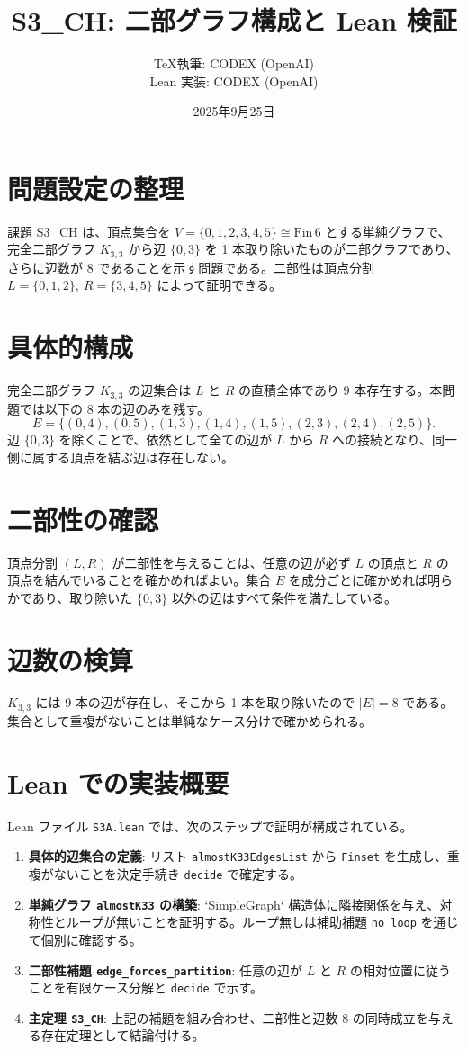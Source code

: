 \documentclass[luatex]{ltjsarticle}
\title{S3\_CH: 二部グラフ構成と Lean 検証}
\author{TeX執筆: CODEX (OpenAI) \\ Lean 実装: CODEX (OpenAI)}
\date{2025年9月25日}
\begin{document}
\maketitle

\section{問題設定の整理}
課題 S3\_CH は、頂点集合を \(V = \{0,1,2,3,4,5\} \cong \mathrm{Fin}\,6\) とする単純グラフで、完全二部グラフ \(K_{3,3}\) から辺 \(\{0,3\}\) を 1 本取り除いたものが二部グラフであり、さらに辺数が 8 であることを示す問題である。二部性は頂点分割 \(L = \{0,1,2\},\ R = \{3,4,5\}\) によって証明できる。

\section{具体的構成}
完全二部グラフ \(K_{3,3}\) の辺集合は \(L\) と \(R\) の直積全体であり 9 本存在する。本問題では以下の 8 本の辺のみを残す。
\[
E = \{(0,4),(0,5),(1,3),(1,4),(1,5),(2,3),(2,4),(2,5)\}.
\]
辺 \(\{0,3\}\) を除くことで、依然として全ての辺が \(L\) から \(R\) への接続となり、同一側に属する頂点を結ぶ辺は存在しない。

\section{二部性の確認}
頂点分割 \((L,R)\) が二部性を与えることは、任意の辺が必ず \(L\) の頂点と \(R\) の頂点を結んでいることを確かめればよい。集合 \(E\) を成分ごとに確かめれば明らかであり、取り除いた \(\{0,3\}\) 以外の辺はすべて条件を満たしている。

\section{辺数の検算}
\(K_{3,3}\) には 9 本の辺が存在し、そこから 1 本を取り除いたので \(|E| = 8\) である。集合として重複がないことは単純なケース分けで確かめられる。

\section{Lean での実装概要}
Lean ファイル \texttt{S3A.lean} では、次のステップで証明が構成されている。
\begin{enumerate}
  \item \textbf{具体的辺集合の定義}: リスト \texttt{almostK33EdgesList} から \texttt{Finset} を生成し、重複がないことを決定手続き \texttt{decide} で確定する。
  \item \textbf{単純グラフ \texttt{almostK33} の構築}: `SimpleGraph` 構造体に隣接関係を与え、対称性とループが無いことを証明する。ループ無しは補助補題 \texttt{no\_loop} を通じて個別に確認する。
  \item \textbf{二部性補題 \texttt{edge\_forces\_partition}}: 任意の辺が \(L\) と \(R\) の相対位置に従うことを有限ケース分解と \texttt{decide} で示す。
  \item \textbf{主定理 \texttt{S3\_CH}}: 上記の補題を組み合わせ、二部性と辺数 8 の同時成立を与える存在定理として結論付ける。
\end{enumerate}
\end{document}
